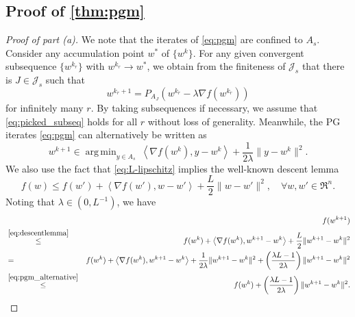 \documentclass{article}
\theoremstyle{plain}
\theoremstyle{definition}
\theoremstyle{remark}
\newcommand{\J}{\mathcal{J}}
\newcommand{\cp}[1]{\footnote{\textbf{CP:} #1}}
\newcommand\inner[2]{\left\langle #1, #2 \right\rangle}
\DeclareMathOperator*{\argmin}{arg\,min}
\begin{document}
\subsection{Proof of \cref{thm:pgm}}
\label{app:thmpgm}
\begin{proof}[Proof of part (a)]
	We note that the iterates of \cref{eq:pgm} are confined to $A_s$.
	Consider any accumulation point $w^*$ of $\{w^k\}$.
	For any given convergent subsequence $\{w^{k_r}\}$ with 
	$w^{k_r}\to w^*$, we obtain from the finiteness of $\J_s$ that
	there is $J \in \J_s$ such that
	\begin{equation}
	\label{eq:picked_subseq}
	w^{k_r+1} = 
	P_{A_J}(w^{k_r} - 
	\lambda \nabla f(w^{k_r}))
	\end{equation}
	 for infinitely many $r$. By taking subsequences if necessary, we assume 
	 that \cref{eq:picked_subseq} holds for all $r$ without loss of 
	 generality. Meanwhile, the PG 
	iterates \cref{eq:pgm} 
	can alternatively be written as
	\begin{equation}
	\label{eq:pgm_alternative}
	w^{k+1} \in \argmin _{y\in A_s} 
	~\inner{\nabla f(w^k)}{y-w^k} + 
	\frac{1}{2\lambda}\|y-w^k\|^2.
	\end{equation}
	We also use the 
	fact that \cref{eq:L-lipschitz} implies the well-known descent lemma 
	\cite[see for example,][Lemma 5.7]{Beck17}
	\begin{equation}
	\label{eq:descentlemma}
	f(w) \leq f(w') + \inner{\nabla f(w')}{w - w'} + 
	\frac{L}{2}\|w 
	- w'\|^2, \quad \forall w, w' \in \Re^n. 
	\end{equation}
	Noting that $\lambda \in (0,L^{-1})$, we have
	\begin{eqnarray*}
	&&f(w^{k+1}) \\
	& \overset{\cref{eq:descentlemma}}{\leq} & f(w^k) + 
	\inner{\nabla f(w^k)}{w^{k+1} - w^k} + 
	\frac{L}{2}\|w^{k+1} 
	- w^k\|^2 \\ 
	& = & f(w^k) + 
	\inner{\nabla f(w^k)}{w^{k+1} - w^k} + 
	\frac{1}{2\lambda}\|w^{k+1} 
	- w^k\|^2
	+ \left( \frac{\lambda L - 1}{2\lambda} \right) \|w^{k+1} 
	- w^k\|^2\\
	& \overset{\cref{eq:pgm_alternative}}{\leq} & f(w^k)  + \left( 
	\frac{\lambda L - 1}{2\lambda} \right) \|w^{k+1} 
	- w^k\|^2.
	\end{eqnarray*}

\end{proof}
\end{document}
